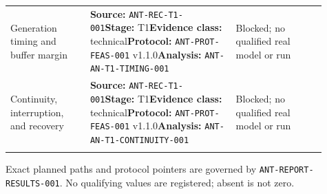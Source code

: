 \begin{tabular}{@{}>{\raggedright\arraybackslash}p{0.23\linewidth}>{\raggedright\arraybackslash}p{0.42\linewidth}>{\raggedright\arraybackslash}p{0.26\linewidth}@{}}
\addlinespace[0.25em]
Generation timing and buffer margin & {\scriptsize\textbf{Source:} \nolinkurl{ANT-REC-T1-001}\newline \textbf{Stage:} T1\newline\textbf{Evidence class:} technical\newline\textbf{Protocol:} \nolinkurl{ANT-PROT-FEAS-001} v1.1.0\newline\textbf{Analysis:} \nolinkurl{ANT-AN-T1-TIMING-001}} & Blocked; no qualified real model or run \\
\addlinespace[0.25em]
Continuity, interruption, and recovery & {\scriptsize\textbf{Source:} \nolinkurl{ANT-REC-T1-001}\newline \textbf{Stage:} T1\newline\textbf{Evidence class:} technical\newline\textbf{Protocol:} \nolinkurl{ANT-PROT-FEAS-001} v1.1.0\newline\textbf{Analysis:} \nolinkurl{ANT-AN-T1-CONTINUITY-001}} & Blocked; no qualified real model or run \\
\addlinespace[0.25em]
\bottomrule
\end{tabular}%
\par\smallskip
{\raggedright\scriptsize Exact planned paths and protocol pointers are governed by \texttt{ANT-REPORT-RESULTS-001}. No qualifying values are registered; absent is not zero.\par}
